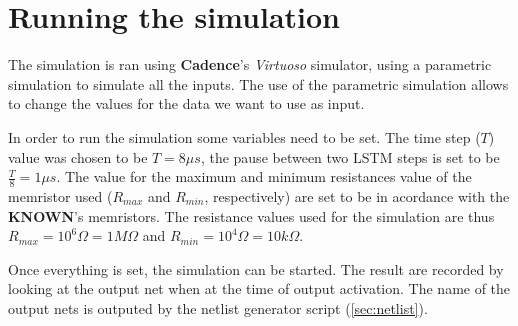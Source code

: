 \section{Running the simulation}\label{sec:run}

The simulation is ran using \textbf{Cadence}'s \textit{Virtuoso} simulator, using a parametric simulation to simulate all the inputs. The use of the parametric simulation allows to change the values for the data we want to use as input.

In order to run the simulation some variables need to be set. The time step ($T$) value was chosen to be $T=8\mu s$, the pause between two \ac{LSTM} steps is set to be $\frac{T}{8}=1\mu s$. The value for the maximum and minimum resistances value of the memristor used ($R_{max}$ and $R_{min}$, respectively) are set to be in acordance with the \textbf{KNOWN}'s memristors. The resistance values used for the simulation are thus $R_{max}=10^6 \Omega=1M\Omega$ and $R_{min}=10^4 \Omega = 10k\Omega$.

Once everything is set, the simulation can be started. The result are recorded by looking at the output net when at the time of output activation. The name of the output nets is outputed by the netlist generator script (\cref{sec:netlist}).
